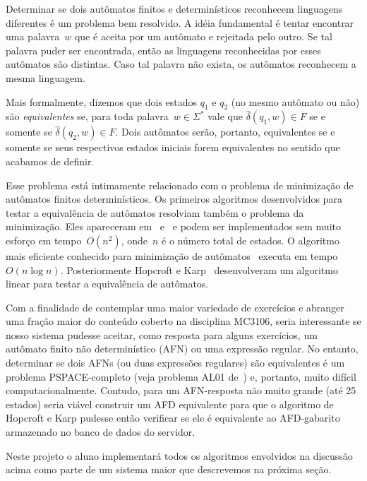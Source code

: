\documentclass[
	12pt,				%
	openany,
	oneside,
	a4paper,			%
	english,			%
	brazil,				%
	]{abntex2}
\begin{document}
Determinar se dois autômatos finitos e determinísticos reconhecem linguagens diferentes é um problema bem resolvido. A idéia fundamental é tentar encontrar uma palavra~$w$ que é aceita por um autômato e rejeitada pelo outro. Se tal palavra puder ser encontrada, então as linguagens reconhecidas por esses autômatos são distintas. Caso tal palavra não exista, os autômatos reconhecem a mesma linguagem. 

Mais formalmente, dizemos que dois estados $q_1$ e $q_2$ (no mesmo autômato ou não) são \emph{equivalentes} se, para toda palavra~$w \in \Sigma^*$ vale que $\hat{\delta}(q_1, w) \in F$ se e somente se $\hat{\delta}(q_2, w) \in F$. Dois autômatos serão, portanto, equivalentes se e somente se seus respectivos estados iniciais forem equivalentes no sentido que acabamos de definir.

Esse problema está intimamente relacionado com o problema de minimização de autômatos finitos determinísticos. Os primeiros algoritmos desenvolvidos para testar a equivalência de autômatos resolviam também o problema da minimização. Eles apareceram em~\cite{huffman} e~\cite{moore} e podem ser implementados sem muito esforço em tempo~$O(n^2)$, onde~$n$ é o número total de estados. O algoritmo mais eficiente conhecido para minimização de autômatos~\cite{hopcroft} executa em tempo~$O(n \log{n})$. Posteriormente Hopcroft e Karp~\cite{hopcroft_karp} desenvolveram um algoritmo linear para testar a equivalência de autômatos.

Com a finalidade de contemplar uma maior variedade de exercícios e abranger uma fração maior do conteúdo coberto na disciplina MC3106, seria interessante se nosso sistema pudesse aceitar, como resposta para alguns exercícios, um autômato finito não determinístico (AFN) ou uma expressão regular. No entanto, determinar se dois AFNs (ou duas expressões regulares) são equivalentes é um problema \textsc{PSPACE}-completo (veja problema AL01 de~\cite{garey79}) e, portanto, muito difícil computacionalmente. Contudo, para um AFN-resposta não muito grande (até 25 estados) seria viável construir um AFD equivalente para que o algoritmo de Hopcroft e Karp pudesse então verificar se ele é equivalente ao AFD-gabarito armazenado no banco de dados do servidor.

Neste projeto o aluno implementará todos os algoritmos envolvidos na discussão acima como parte de um sistema maior que descrevemos na próxima seção.
\end{document}
